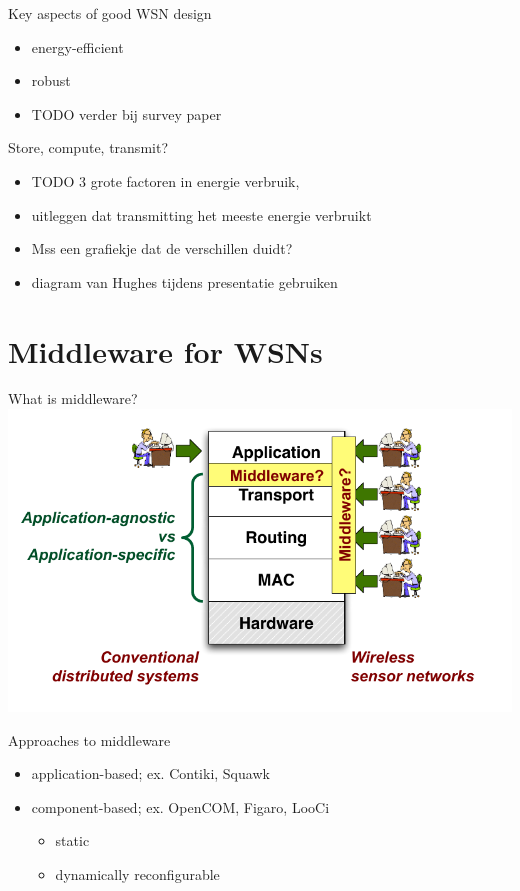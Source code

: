 \documentclass[presentation, bigger]{beamer}
\begin{document}
\begin{frame}[label=sec-1-5]{Key aspects of good WSN design}
\begin{itemize}
\item energy-efficient
\item robust
\item TODO verder bij survey paper
\end{itemize}
\end{frame}

\begin{frame}[label=sec-1-6]{Store, compute, transmit?}
\begin{itemize}
\item TODO 3 grote factoren in energie verbruik,
\item uitleggen dat transmitting het meeste energie verbruikt
\item Mss een grafiekje dat de verschillen duidt?
\item diagram van Hughes tijdens presentatie gebruiken
\end{itemize}
\end{frame}
\section{Middleware for WSNs}
\label{sec-2}
\begin{frame}[label=sec-2-1]{What is middleware?}
\includegraphics[width=\textwidth,keepaspectration=true]{middleware}
\end{frame}

\begin{frame}[label=sec-2-2]{Approaches to middleware}
\begin{itemize}
\item application-based; ex. Contiki, Squawk
\item component-based; ex. OpenCOM, Figaro, LooCi
\begin{itemize}
\item static
\item dynamically reconfigurable
\end{itemize}
\end{itemize}
\end{frame}
\end{document}
